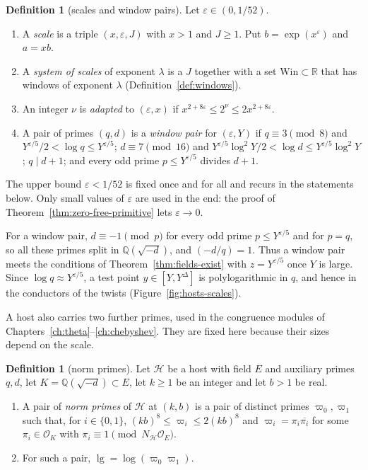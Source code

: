 \documentclass[11pt]{amsbook}
\theoremstyle{plain}
\theoremstyle{definition}
\newtheorem{definition}[theorem]{Definition}
\theoremstyle{remark}
\numberwithin{equation}{section}
\numberwithin{figure}{chapter}
\numberwithin{table}{chapter}
\newcommand{\Q}{\mathbb{Q}}
\newcommand{\R}{\mathbb{R}}
\newcommand{\eps}{\varepsilon}
\newcommand{\lgv}{\operatorname{lg}}
\newcommand{\Win}{\mathrm{Win}}
\begin{document}
\begin{definition}[scales and window pairs]\label{def:scales}
Let $\eps\in(0,1/52)$.
\begin{enumerate}[label=(\arabic*)]
\item A \emph{scale} is a triple $(x,\eps,J)$ with $x>1$ and $J\ge1$.
Put $b=\exp(x^\eps)$ and $a=xb$.
\item A \emph{system of scales} of exponent $\lambda$ is a $J$ together
with a set $\Win\subset\R$ that has windows of exponent $\lambda$
(Definition~\ref{def:windows}).
\item An integer $\nu$ is \emph{adapted} to $(\eps,x)$ if
$x^{2+8\eps}\le2^\nu\le2x^{2+8\eps}$.
\item A pair of primes $(q,d)$ is a \emph{window pair} for $(\eps,Y)$
if $q\equiv3\pmod8$ and $Y^{\eps/5}/2<\log q\le Y^{\eps/5}$;
$d\equiv7\pmod{16}$ and $Y^{\eps/5}\log^2Y/2<\log d\le
Y^{\eps/5}\log^2Y$; $q\mid d+1$; and every odd prime $p\le Y^{\eps/5}$
divides $d+1$.
\end{enumerate}
\end{definition}

The upper bound $\eps<1/52$ is fixed once and for all and recurs in
the statements below. Only small values of $\eps$ are used in the end:
the proof of Theorem~\ref{thm:zero-free-primitive} lets $\eps\to0$.

For a window pair, $d\equiv-1\pmod p$ for every odd prime
$p\le Y^{\eps/5}$ and for $p=q$, so all these primes split in
$\Q(\sqrt{-d})$, and $(-d/q)=1$. Thus a window pair meets the
conditions of Theorem~\ref{thm:fields-exist} with $z=Y^{\eps/5}$ once
$Y$ is large. Since $\log q\approx Y^{\eps/5}$, a test point
$y\in[Y,Y^\Delta]$ is polylogarithmic in $q$, and hence in the
conductors of the twists (Figure~\ref{fig:hosts-scales}).

A host also carries two further primes, used in the congruence
modules of Chapters~\ref{ch:theta}--\ref{ch:chebyshev}. They are
fixed here because their sizes depend on the scale.

\begin{definition}[norm primes]\label{def:norm-primes}
Let $\mathcal H$ be a host with field $E$ and auxiliary primes $q,d$,
let $K=\Q(\sqrt{-d})\subset E$, let $k\ge1$ be an integer and let $b>1$ be real.
\begin{enumerate}[label=(\arabic*)]
\item A pair of \emph{norm primes} of $\mathcal H$ at $(k,b)$ is a
pair of distinct primes $\varpi_0,\varpi_1$ such that, for
$i\in\{0,1\}$, $(kb)^8\le\varpi_i\le2(kb)^8$ and
$\varpi_i=\pi_i\overline{\pi_i}$ for some $\pi_i\in\mathcal O_K$ with
$\pi_i\equiv1\pmod{N_{\mathcal H}\mathcal O_E}$.
\item For such a pair, $\lgv=\log(\varpi_0\varpi_1)$.
\end{enumerate}
\end{definition}
\end{document}
